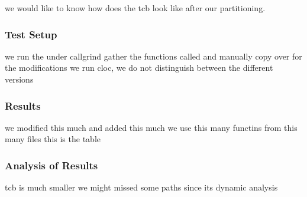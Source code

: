 \documentclass[../../../main.tex]{subfiles}
\begin{document}
\label{sec:tcb-analysis}
we would like to know how does the tcb look like after our partitioning.

\subsubsection*{Test Setup}
we run the \enclaveprogram under callgrind 
gather the functions called and manually copy over
for the modifications we run cloc, we do not distinguish between the different versions

\subsubsection*{Results}
we modified this much and added this much
we use this many functins from this many files
this is the table

\subsubsection*{Analysis of Results}
tcb is much smaller
we might missed some paths since its dynamic analysis
\end{document}
